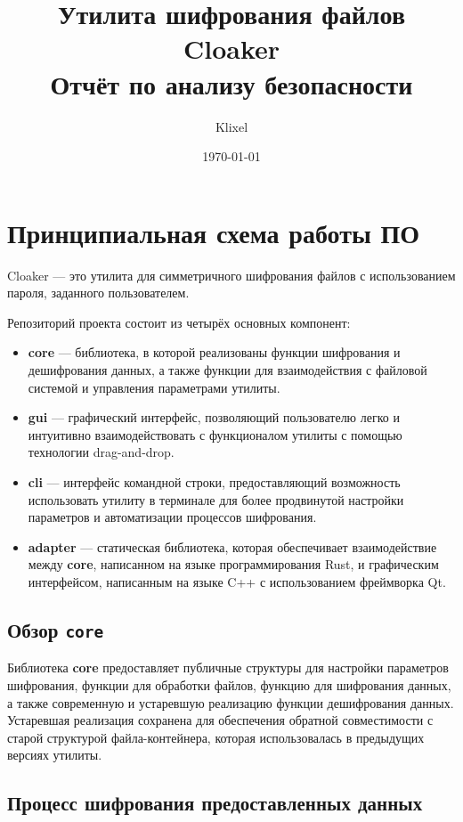 \documentclass[12pt,a4paper]{article}
\title{\textbf{Утилита шифрования файлов Cloaker}\\
       \large Отчёт по анализу безопасности}
\author{Klixel}
\date{\today}
\begin{document}
\maketitle
\newpage
\tableofcontents
\newpage

\section{Принципиальная схема работы ПО}

Cloaker --- это утилита для симметричного шифрования файлов с использованием пароля, заданного пользователем.

Репозиторий проекта состоит из четырёх основных компонент:
\begin{itemize}
    \item \textbf{core} --- библиотека, в которой реализованы функции шифрования и дешифрования данных, а также функции для взаимодействия с файловой системой и управления параметрами утилиты.
    \item \textbf{gui} --- графический интерфейс, позволяющий пользователю легко и интуитивно взаимодействовать с функционалом утилиты с помощью технологии drag-and-drop.
    \item \textbf{cli} --- интерфейс командной строки, предоставляющий возможность использовать утилиту в терминале для более продвинутой настройки параметров и автоматизации процессов шифрования.
    \item \textbf{adapter} --- статическая библиотека, которая обеспечивает взаимодействие между \textbf{core}, написанном на языке программирования Rust, и графическим интерфейсом, написанным на языке C++ с использованием фреймворка Qt.
\end{itemize}

\subsection{Обзор \texttt{core}}

Библиотека \textbf{core} предоставляет публичные структуры для настройки параметров шифрования, функции для обработки файлов, функцию для шифрования данных, а также современную и устаревшую реализацию функции дешифрования данных. Устаревшая реализация сохранена для обеспечения обратной совместимости с старой структурой файла-контейнера, которая использовалась в предыдущих версиях утилиты.

\subsection*{Процесс шифрования предоставленных данных}
\end{document}
